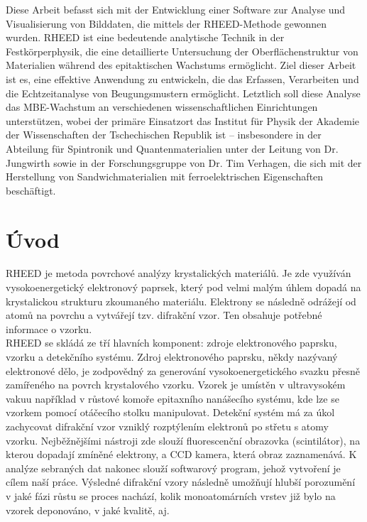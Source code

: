 \documentclass{article}
\begin{document}
Diese Arbeit befasst sich mit der Entwicklung einer Software zur Analyse und Visualisierung von Bilddaten, die mittels der RHEED-Methode gewonnen wurden. RHEED ist eine bedeutende analytische Technik in der Festkörperphysik, die eine detaillierte Untersuchung der Oberflächenstruktur von Materialien während des epitaktischen Wachstums ermöglicht. Ziel dieser Arbeit ist es, eine effektive Anwendung zu entwickeln, die das Erfassen, Verarbeiten und die Echtzeitanalyse von Beugungsmustern ermöglicht. Letztlich soll diese Analyse das MBE-Wachstum an verschiedenen wissenschaftlichen Einrichtungen unterstützen, wobei der primäre Einsatzort das Institut für Physik der Akademie der Wissenschaften der Tschechischen Republik ist – insbesondere in der Abteilung für Spintronik und Quantenmaterialien unter der Leitung von Dr. Jungwirth sowie in der Forschungsgruppe von Dr. Tim Verhagen, die sich mit der Herstellung von Sandwichmaterialien mit ferroelektrischen Eigenschaften beschäftigt.
\newpage

\section{Úvod}
    RHEED je metoda povrchové analýzy krystalických materiálů. Je zde využíván vysokoenergetický elektronový paprsek, který pod velmi malým úhlem dopadá na krystalickou strukturu zkoumaného materiálu. Elektrony se následně odrážejí od atomů na povrchu a vytvářejí tzv. difrakční vzor. Ten obsahuje potřebné informace o vzorku.\\

    RHEED se skládá ze tří hlavních komponent: zdroje elektronového paprsku, vzorku a detekčního systému. Zdroj elektronového paprsku, někdy nazývaný elektronové dělo, je zodpovědný za generování vysokoenergetického svazku přesně zamířeného na povrch krystalového vzorku. Vzorek je umístěn v ultravysokém vakuu například v růstové komoře epitaxního nanášecího systému, kde lze se vzorkem pomocí otáčecího stolku manipulovat. Detekční systém má za úkol zachycovat difrakční vzor vzniklý rozptýlením elektronů po střetu s atomy vzorku. Nejběžnějšími nástroji zde slouží fluorescenční obrazovka (scintilátor), na kterou dopadají zmíněné elektrony, a CCD kamera, která obraz zaznamenává. K analýze sebraných dat nakonec slouží softwarový program, jehož vytvoření je cílem naší práce. Výsledné difrakční vzory následně umožňují hlubší porozumění v jaké fázi růstu se proces nachází, kolik monoatomárních vrstev již bylo na vzorek deponováno, v jaké kvalitě, aj.
    
\end{document}
